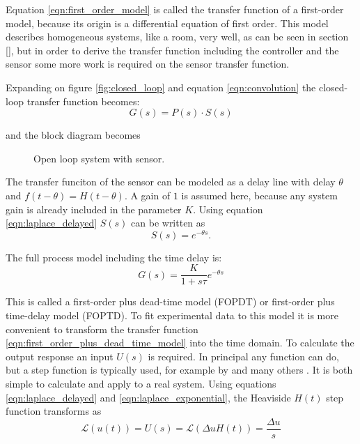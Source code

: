 Equation \ref{eqn:first_order_model} is called the transfer function of a first-order model, because its origin is a differential equation of first order. This model describes homogeneous systems, like a room, very well, as can be seen in section \ref{}, but in order to derive the transfer function including the controller and the sensor some more work is required on the sensor transfer function.

Expanding on figure \ref{fig:closed_loop} and equation \ref{eqn:convolution} the closed-loop transfer function becomes:
\begin{equation}
    G(s) = P(s) \cdot S(s)
\end{equation}

and the block diagram becomes

\begin{figure}[ht]
    \centering
    \caption{Open loop system with sensor.}
\end{figure}

The transfer funciton of the sensor can be modeled as a delay line with delay $\theta$ and $f(t-\theta) = H(t-\theta)$. A gain of $1$ is assumed here, because any system gain is already included in the parameter $K$. Using equation \ref{eqn:laplace_delayed} $S(s)$ can be written as
\begin{equation}
    S(s) = e^{-\theta s} .
\end{equation}

The full process model including the time delay is:
\begin{equation}
    G(s) = \frac{K}{1 + s\tau} e^{-\theta s} \label{eqn:first_order_plus_dead_time_model}
\end{equation}

This is called a first-order plus dead-time model (FOPDT) or first-order plus time-delay model (FOPTD). To fit experimental data to this model it is more convenient to transform the transfer function \ref{eqn:first_order_plus_dead_time_model} into the time domain. To calculate the output response an input $U(s)$ is required. In principal any function can do, but a step function is typically used, for example by \citeauthor{ziegler_nichols} \cite{ziegler_nichols} and many others \cite{tuning_rules,pessen_integral,simc,smic2,pid_controllers_for_time_delay_systems,pi_stabilization_of_fopdt_systems, pid_basics}. It is both simple to calculate and apply to a real system. Using equations \ref{eqn:laplace_delayed} and \ref{eqn:laplace_exponential}, the Heaviside $H(t)$ step function transforms as
\begin{equation}
    \mathscr{L} \left(u(t) \right) = U(s) = \mathscr{L} \left( \Delta u H(t) \right) = \frac{\Delta u}{s}
\end{equation}

